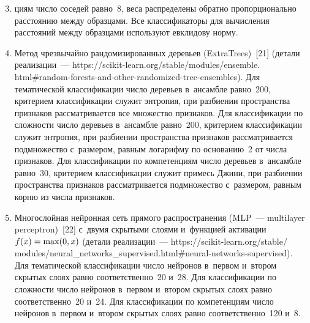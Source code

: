\begin{multicols}{2}

\begin{enumerate}[1.]
\setcounter{enumi}{2}
\item[\,] циям число соседей рав\-но~8, веса распределены обрат\-но 
пропорционально расстоянию меж\-ду образцами. Все классификаторы для 
вычисления расстояний меж\-ду образцами используют евклидову норму.
\item Метод чрезвычайно рандомизированных деревьев (ExtraTrees)~[21] 
(детали реализации~---
{\sf https://scikit-learn.org/stable/modules/ensemble.} {\sf html\#random-forests-and-other-randomized-tree-ensembles}). Для 
тематической классификации число деревьев в~ансамбле равно~200, 
критерием классификации служит энтропия, при раз\-би\-ении пространства 
признаков рассматривается все множество признаков. Для классификации по 
сложности число деревьев в~ансамбле равно~200, критерием классификации 
служит энтропия, при разбиении пространства признаков рассматривается 
подмножество с~размером, равным логарифму по основанию~2 от числа 
признаков. Для классификации по компетенциям число деревьев в~ансамбле 
равно~30, критерием классификации служит примесь Джини, при разбиении 
пространства признаков рассматривается подмножество с~размером, равным 
корню из чис\-ла признаков.
\item Многослойная нейронная сеть прямого распространения (MLP~--- multilayer perceptron)~[22] 
с~двумя скрытыми слоями и~функцией активации $f(x)\hm= \max(0,x)$ 
(детали реализации~--- {\sf  
https://scikit-learn.org/stable/} {\sf modules/neural\_networks\_supervised.html\#neural-networks-supervised}). Для тематической 
классификации число нейронов в~первом и~втором скрытых слоях равно 
соответственно~20 и~28. Для классификации по сложности число нейронов в~первом и~втором скрытых слоях равно соответственно~20 и~24. Для 
классификации по компетенциям число нейронов в~первом и~втором скрытых 
слоях равно соответственно~120 и~8.
      \end{enumerate}
      

\end{multicols}
